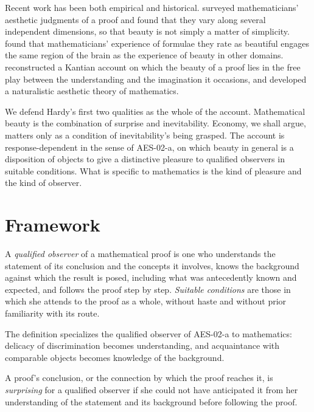 \documentclass{situationist-preprint}
\begin{document}
Recent work has been both empirical and historical. \citet{InglisAberdein2015} surveyed mathematicians' aesthetic judgments of a proof and found that they vary along several independent dimensions, so that beauty is not simply a matter of simplicity. \citet{ZekiEtAl2014} found that mathematicians' experience of formulae they rate as beautiful engages the same region of the brain as the experience of beauty in other domains. \citet{Breitenbach2015} reconstructed a Kantian account on which the beauty of a proof lies in the free play between the understanding and the imagination it occasions, and \citet{Montano2014} developed a naturalistic aesthetic theory of mathematics.

We defend Hardy's first two qualities as the whole of the account. Mathematical beauty is the combination of surprise and inevitability. Economy, we shall argue, matters only as a condition of inevitability's being grasped. The account is response-dependent in the sense of AES-02-a, on which beauty in general is a disposition of objects to give a distinctive pleasure to qualified observers in suitable conditions. What is specific to mathematics is the kind of pleasure and the kind of observer.

\section{Framework}

\begin{definition}\label{d:obs}
A \emph{qualified observer} of a mathematical proof is one who understands the statement of its conclusion and the concepts it involves, knows the background against which the result is posed, including what was antecedently known and expected, and follows the proof step by step. \emph{Suitable conditions} are those in which she attends to the proof as a whole, without haste and without prior familiarity with its route.
\end{definition}

The definition specializes the qualified observer of AES-02-a to mathematics: delicacy of discrimination becomes understanding, and acquaintance with comparable objects becomes knowledge of the background.

\begin{definition}[Surprise]\label{d:surp}
A proof's conclusion, or the connection by which the proof reaches it, is \emph{surprising} for a qualified observer if she could not have anticipated it from her understanding of the statement and its background before following the proof.
\end{definition}
\end{document}
